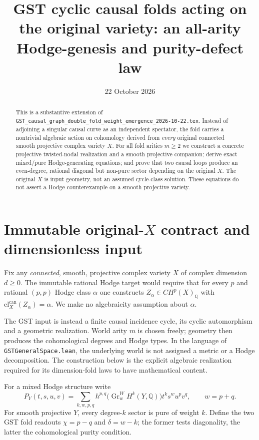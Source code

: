 \documentclass[11pt]{article}
\title{GST cyclic causal folds acting on the original variety:
an all-arity Hodge-genesis and purity-defect law}
\date{22 October 2026}
\begin{document}
\maketitle

\begin{abstract}
This is a substantive extension of
\texttt{GST\_causal\_graph\_double\_fold\_weight\_emergence\_2026-10-22.tex}.
Instead of adjoining a singular causal curve as an independent spectator,
the fold carries a nontrivial algebraic action on cohomology derived from
\emph{every} original connected smooth projective complex variety $X$.
For all fold arities $m\geq2$ we construct a concrete projective
twisted-nodal realization and a smooth projective companion; derive exact
mixed/pure Hodge-generating equations; and prove that two causal loops
produce an even-degree, rational diagonal but non-pure sector depending on
the original $X$.  The original $X$ is input geometry, not an assumed
cycle-class solution.  These equations do not assert a Hodge counterexample
on a smooth projective variety.
\end{abstract}

\section{Immutable original-$X$ contract and dimensionless input}
Fix any \emph{connected}, smooth, projective complex variety $X$
of complex dimension $d\geq0$.  The immutable rational Hodge target
would require that for every $p$ and rational $(p,p)$ Hodge class
$\alpha$ one constructs $Z_\alpha\in CH^p(X)_{\mathbb Q}$
with $\mathrm{cl}^{\mathrm{can}}_X(Z_\alpha)=\alpha$.
We make no algebraicity assumption about $\alpha$.

The GST input is instead a finite causal incidence cycle, its cyclic
automorphism and a geometric realization.  World arity $m$ is chosen
freely; geometry then produces the cohomological degrees and Hodge types.
In the language of \texttt{GSTGeneralSpace.lean}, the underlying world
is not assigned a metric or a Hodge decomposition.  The construction
below is the explicit algebraic realization required for its
dimension-fold laws to have mathematical content.

For a mixed Hodge structure write
\[
 P_Y(t,s,u,v)=
 \sum_{k,w,p,q}
 h^{p,q}\bigl(\operatorname{Gr}^W_wH^k(Y,\mathbb Q)\bigr)
 t^k s^w u^p v^q,\qquad w=p+q.
\]
For smooth projective $Y$, every degree-$k$ sector is pure of
weight $k$.  Define the two GST fold readouts
$\chi=p-q$ and $\delta=w-k$; the former tests diagonality, the latter
the cohomological purity condition.
\end{document}
